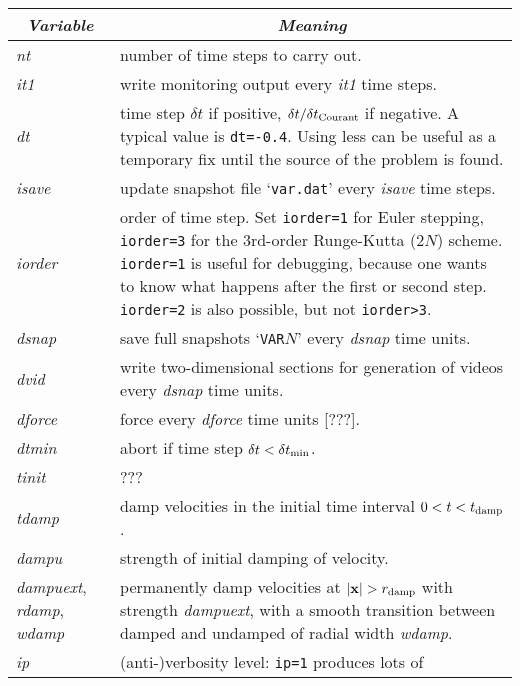 \documentclass[12pt,twoside,notitlepage,a4paper]{article}
\newcommand{\code}[1]{\texttt{#1}}
\newcommand{\var}[1]{\textsl{#1}\index{#1}\/}
\newcommand{\file}[1]{`\texttt{#1}'}
\newcommand{\vekt}[1] {\mathbf{#1}}
\newcommand{\xv}            {\vekt{x}}
\begin{document}
\begin{longtable}{lp{}}
\toprule
  \multicolumn{1}{c}{\emph{Variable}}
               & \multicolumn{1}{c}{\emph{Meaning}} \\
\midrule
  \var{nt}     & number of time steps to carry out. \\
  \var{it1}    & write monitoring output every \var{it1} time steps.\\
  \var{dt}     & time step $\delta t$ if positive,
                 $\delta t/\delta t_{\rm Courant}$ if negative. A typical
                 value is \code{dt=-0.4}. Using less can be useful as a
                 temporary fix until the source of the problem is found.\\
  \var{isave}  & update snapshot file \file{var.dat} every \var{isave}
                 time steps. \\
  \var{iorder} & order of time step. Set \code{iorder=1} for Euler
                 stepping, \code{iorder=3} for the 3rd-order Runge-Kutta
                 (2$N$) scheme. \code{iorder=1} is useful for debugging,
                 because one wants to know what happens after the first
                 or second step. \code{iorder=2} is also possible, but
                 not \code{iorder>3}.\\
  \var{dsnap}  & save full snapshots \file{VAR$N$} every \var{dsnap} time
                 units. \\
  \var{dvid}   & write two-dimensional sections for generation of videos
                 every \var{dsnap} time units. \\
  \var{dforce} & force every \var{dforce} time units [???]. \\
  \var{dtmin}  & abort if time step $\delta t < \delta t_{\rm min}$. \\
  \var{tinit}  & ??? \\
  \var{tdamp}  & damp velocities in the initial time interval
                 $0 < t < t_{\rm damp}$. \\
  \var{dampu}  & strength of initial damping of velocity. \\
  \var{dampuext}, \var{rdamp}, \var{wdamp}
               & permanently damp velocities at $|\xv| > r_{\rm damp}$
                 with strength \var{dampuext}, with a smooth transition
                 between damped and undamped of radial width \var{wdamp}. \\
  \var{ip}     & (anti-)verbosity level: \code{ip=1} produces lots of

\end{longtable}
\end{document}
